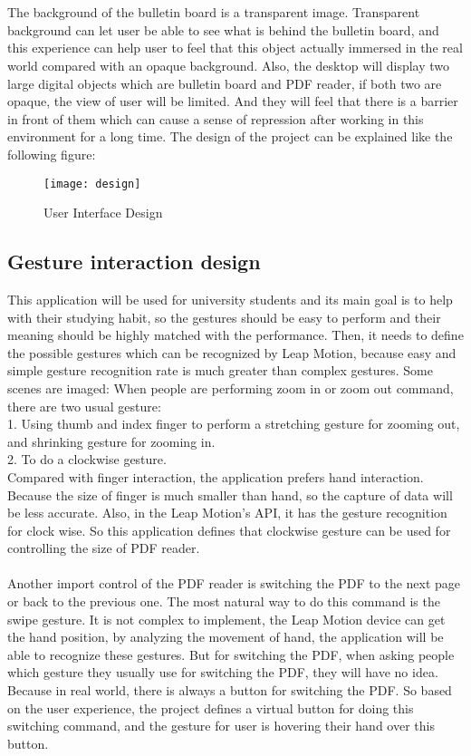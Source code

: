 \\
\\
The background of the bulletin board is a transparent image. Transparent background can let user be able to see what is behind the bulletin board, and this experience can help user to feel that this object actually immersed in the real world compared with an opaque background. Also, the desktop will display two large digital objects which are bulletin board and PDF reader, if both two are opaque, the view of user will be limited. And they will feel that there is a barrier in front of them which can cause a sense of repression after working in this environment for a long time. The design of the project can be explained like the following figure:
\begin{figure}[h]
    \centering
	\texttt{[image: design]}
    \caption{User Interface Design}
    \label{fig:mesh1}
\end{figure}
\subsection{Gesture interaction design}
This application will be used for university students and its main goal is to help with their studying habit, so the gestures should be easy to perform and their meaning should be highly matched with the performance. Then, it needs to define the possible gestures which can be recognized by Leap Motion, because easy and simple gesture recognition rate is much greater than complex gestures. Some scenes are imaged: When people are performing zoom in or zoom out command, there are two usual gesture:\\ 1. Using thumb and index finger to perform a stretching gesture for zooming out, and shrinking gesture for zooming in. \\2. To do a clockwise gesture. \\Compared with finger interaction, the application prefers hand interaction. Because the size of finger is much smaller than hand, so the capture of data will be less accurate. Also, in the Leap Motion’s API, it has the gesture recognition for clock wise. So this application defines that clockwise gesture can be used for controlling the size of PDF reader. 
\\
\\
Another import control of the PDF reader is switching the PDF to the next page or back to the previous one. The most natural way to do this command is the swipe gesture. It is not complex to implement, the Leap Motion device can get the hand position, by analyzing the movement of hand, the application will be able to recognize these gestures. But for switching the PDF, when asking people which gesture they usually use for switching the PDF, they will have no idea. Because in real world, there is always a button for switching the PDF. So based on the user experience, the project defines a virtual button for doing this switching command, and the gesture for user is hovering their hand over this button. 
